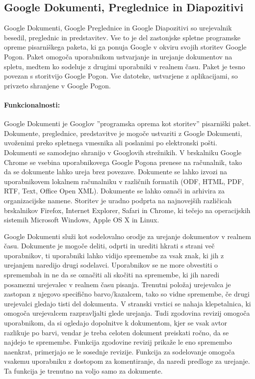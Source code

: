\documentclass[a4paper, 12pt]{book}
\begin{document}
\subsection{Google Dokumenti, Preglednice in Diapozitivi}
\label{googleDocs}

Google Dokumenti, Google Preglednice in Google Diapozitivi so urejevalnik besedil, preglednic in predstavitev. Vse to je del zastonjske spletne programske opreme pisarniškega paketa, ki ga ponuja Google v okviru svojih storitev Google Pogon. Paket omogoča uporabnikom ustvarjanje in urejanje dokumentov na spletu, medtem ko sodeluje z drugimi uporabniki v realnem času. Paket je tesno povezan s storitvijo Google Pogon. \cite{52} Vse datoteke, ustvarjene z aplikacijami, so privzeto shranjene v Google Pogon. 

\paragraph{Funkcionalnosti:\\}

Google Dokumenti je Googlov ''programska oprema kot storitev'' pisarniški paket. Dokumente, preglednice, predstavitve je mogoče ustvariti z Google Dokumenti, uvoženimi preko spletnega vmesnika ali poslanimi po elektronski pošti. Dokumenti se samodejno shranijo v Googlovih strežnikih. V brskalniku Google Chrome se vsebina uporabnikovega Google Pogona prenese na računalnik, tako da se dokumente lahko ureja brez povezave. \cite{53} Dokumente se lahko izvozi na uporabnikovem lokalnem računalniku v različnih formatih (ODF, HTML, PDF, RTF, Text, Office Open XML). Dokumente se lahko označi in arhivira za organizacijske namene. Storitev je uradno podprta na najnovejših različicah brskalnikov Firefox, Internet Explorer, Safari in Chrome, ki tečejo na operacijskih sistemih Microsoft Windows, Apple OS X in Linux. \cite{54} 

Google Dokumenti služi kot sodelovalno orodje za urejanje dokumentov v realnem času. Dokumente je mogoče deliti, odprti in urediti  hkrati s strani več uporabnikov, ti uporabniki lahko vidijo spremembe za vsak znak, ki jih z urejanjem naredijo drugi sodelavci. Uporabnikov se ne more obvestiti o spremembah in ne da se označiti ali skočiti na spremembe, ki jih naredi posamezni urejevalec v realnem času pisanja. Trenutni položaj urejevalca je zastopan z njegovo specifično barvo/kazalcem, tako so vidne spremembe, če drugi urejevalci gledajo tisti del dokumenta. V stranski vrstici se nahaja klepetalnica, ki omogoča urejevalcem razpravljalti glede urejanja. Tudi zgodovina revizij omogoča uporabnikom, da si ogledajo dopolnitve k dokumentom, kjer se vsak avtor razlikuje po barvi, vendar je treba celoten dokument preiskati ročno, da se najdejo te spremembe. Funkcija zgodovine revizij prikaže le eno spremembo naenkrat, primerjajo se le sosednje revizije. Funkcija za sodelovanje omogoča vsakemu uporabniku z dostopom za komentiranje, da naredi predloge za urejanje. Ta funkcija je trenutno na voljo samo za dokumente. \cite{55,56}
\end{document}
